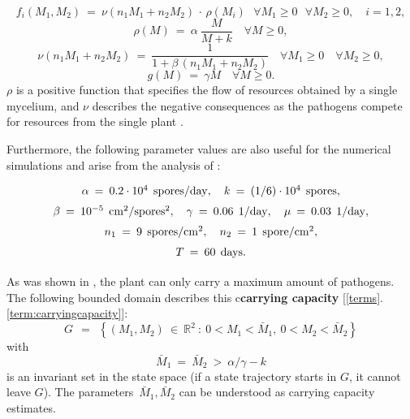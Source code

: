 \documentclass[11pt]{amsart}
\begin{document}
\begin{equation}
f_i(M_1, M_2) \: = \: \nu(n_1 M_1 + n_2 M_2) \, \cdot \, \rho(M_i) \:\:\:
\forall M_1 \geqslant 0 \:\:\: \forall M_2 \geqslant 0, \quad i = 1,2, 
  \label{4}
\end{equation}
\begin{equation}
\rho(M) \: = \: \alpha \: \dfrac{M}{M + k} \quad \forall M \geqslant 0, 
  \label{5_1}
\end{equation}
\begin{equation}
\nu(n_1 M_1 + n_2 M_2) \: = \: \dfrac{1}{1 + \beta \, (n_1 M_1 + n_2 M_2)}
  \quad
\forall M_1 \geqslant 0 \quad \forall M_2 \geqslant 0,  \label{5_2}
\end{equation}
\begin{equation}
g(M) \: = \: \gamma M \quad \forall M \geqslant 0.  \label{6}
\end{equation}
$\rho$ is a positive function that specifies the flow of resources obtained by a single mycelium, and $\nu$ describes the negative consequences as the pathogens compete for resources from the single plant  \cite{YegorovGrognardMailleretHalkettBernhard2019}.

Furthermore, the following parameter values are also useful for the numerical
simulations and arise from the analysis of
\cite{YegorovGrognardMailleretHalkett2017}:
\begin{equation}
\arraycolsep=1.3pt
\def\arraystretch{1.5}
\begin{array}{c}
\alpha \: = \: 0.2 \cdot 10^4 \:\: \mathrm{spores} / \mathrm{day}, \quad
k \: = \: (1/6) \cdot 10^4 \:\: \mathrm{spores}, \\
\beta \: = \: 10^{-5} \:\: \mathrm{cm}^2 / \mathrm{spores}^2, \quad \gamma
  \: = \: 0.06 \:\: 1 / \mathrm{day}, \quad
\mu \: = \: 0.03 \:\: 1 / \mathrm{day}, \\
n_1 \: = \: 9 \:\: \mathrm{spores} / \mathrm{cm}^2, \quad n_2 \: = \: 1 \:\:
  \mathrm{spore} / \mathrm{cm}^2, \\
T \: = \: 60 \:\: \mathrm{days}.
\end{array}  \label{19}
\end{equation}

As was shown in \cite{YegorovGrognardMailleretHalkettBernhard2019}, the plant can only carry a maximum amount of pathogens. The following bounded
domain describes this c\textbf{carrying capacity} [\ref{terms}.\ref{term:carryingcapacity}]:
\begin{equation}
G \:\: = \:\: \left\{ (M_1, M_2) \: \in \: \mathbb{R}^2 \: \colon \: 0 < M_1 <
  \bar{M}_1, \:
0 < M_2 < \bar{M}_2 \right\}  \label{2}
\end{equation}
with
\begin{equation}
\bar{M}_1 \: = \: \bar{M}_2 \: > \: \alpha / \gamma - k  \label{2_1}
\end{equation}
is an invariant set in the state space (if a state trajectory starts in $ G $,
it cannot leave $ G $). The parameters~$ \bar{M}_1, \bar{M}_2 $ can be
understood as 
carrying capacity estimates. 
\end{document}
